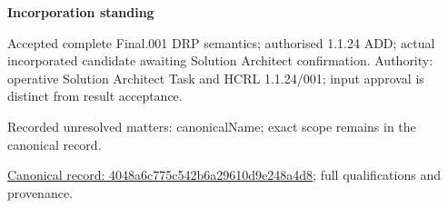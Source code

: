 \par\medskip\textbf{Incorporation standing}\par


Accepted complete Final.001 DRP semantics; authorised 1.1.24 ADD; actual incorporated candidate awaiting Solution Architect confirmation. Authority: operative Solution Architect Task and HCRL 1.1.24/001; input approval is distinct from result acceptance.


{\small Recorded unresolved matters: canonicalName; exact scope remains in the canonical record.}\par
{\footnotesize \href{../../../../continuum/technology/system-software/4048a6c775c542b6a29610d9e248a4d8.md}{Canonical record: 4048a6c775c542b6a29610d9e248a4d8}; full qualifications and provenance.}\par
